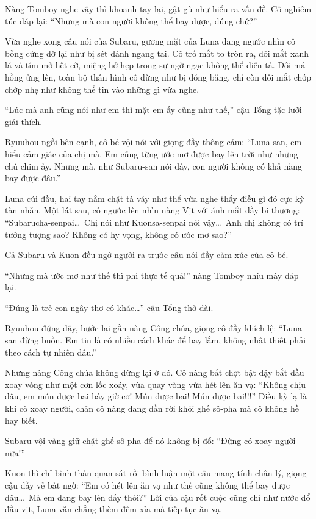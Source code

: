 \documentclass[../main.tex]{subfiles}
\begin{document}
Nàng Tomboy nghe vậy thì khoanh tay lại, gật gù như hiểu ra vấn đề. Cô nghiêm túc đáp lại: ``Nhưng mà con người không thể bay được, đúng chứ?''

Vừa nghe xong câu nói của Subaru, gương mặt của Luna đang ngước nhìn cô bỗng cứng đờ lại như bị sét đánh ngang tai. Cô trố mắt to tròn ra, đôi mắt xanh lá và tím mở hết cỡ, miệng hở hẹp trong sự ngờ ngạc không thể diễn tả. Đôi má hồng ửng lên, toàn bộ thân hình cô dừng như bị đóng băng, chỉ còn đôi mắt chớp chớp nhẹ như không thể tin vào những gì vừa nghe.


``Lúc mà anh cũng nói như em thì mặt em ấy cũng như thế,'' cậu Tổng tặc lưỡi giải thích.

Ryuuhou ngồi bên cạnh, cô bé vội nói với giọng đầy thông cảm: ``Luna-san, em hiểu cảm giác của chị mà. Em cũng từng ước mơ được bay lên trời như những chú chim ấy. Nhưng mà, như Subaru-san nói đấy, con người không có khả năng bay được đâu.''

Luna cúi đầu, hai tay nắm chặt tà váy như thể vừa nghe thấy điều gì đó cực kỳ tàn nhẫn. Một lát sau, cô ngước lên nhìn nàng Vịt với ánh mắt đầy bi thương: ``Subarucha-senpai\dots\ Chị nói như Kuonsa-senpai nói vậy\dots\ Anh chị không có trí tưởng tượng sao? Không có hy vọng, không có ước mơ sao?''

Cả Subaru và Kuon đều ngớ người ra trước câu nói đầy cảm xúc của cô bé.

``Nhưng mà ước mơ như thế thì phi thực tế quá!'' nàng Tomboy nhíu mày đáp lại.

``Đúng là trẻ con ngây thơ có khác\dots'' cậu Tổng thở dài.

Ryuuhou đứng dậy, bước lại gần nàng Công chúa, giọng cô đầy khích lệ: ``Luna-san đừng buồn. Em tin là có nhiều cách khác để bay lắm, không nhất thiết phải theo cách tự nhiên đâu.''

Nhưng nàng Công chúa không dừng lại ở đó. Cô nàng bất chợt bật dậy bắt đầu xoay vòng như một cơn lốc xoáy, vừa quay vòng vừa hét lên ăn vạ: ``Không chịu đâu, em mún được bai bây giờ cơ! Mún được bai! Mún được bai!!!'' Điều kỳ lạ là khi cô xoay người, chân cô nàng đang dần rời khỏi ghế sô-pha mà cô không hề hay biết.


Subaru vội vàng giữ chặt ghế sô-pha để nó không bị đổ: ``Đừng có xoay người nữa!''

Kuon thì chỉ bình thản quan sát rồi bình luận một câu mang tính chân lý, giọng cậu đầy vẻ bất ngờ: ``Em có hét lên ăn vạ như thế cũng không thể bay được đâu\dots\ Mà em đang bay lên đấy thôi?'' Lời của cậu rốt cuộc cũng chỉ như nước đổ đầu vịt, Luna vẫn chẳng thèm đếm xỉa mà tiếp tục ăn vạ.
\end{document}
